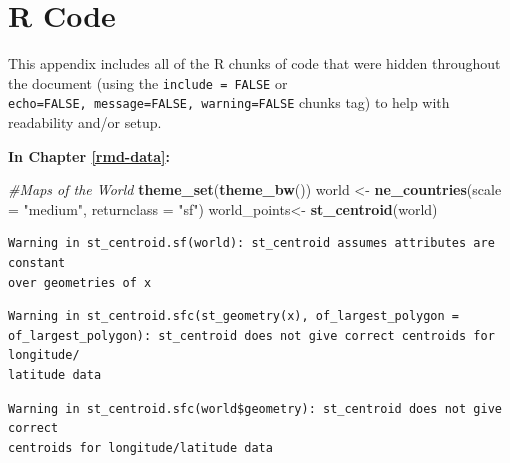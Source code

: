 \documentclass[12pt,oneside]{reedthesis}
\newenvironment{Shaded}{\begin{snugshade}}{\end{snugshade}}
\newcommand{\CommentTok}[1]{\textcolor[rgb]{0.56,0.35,0.01}{\textit{#1}}}
\newcommand{\DataTypeTok}[1]{\textcolor[rgb]{0.13,0.29,0.53}{#1}}
\newcommand{\KeywordTok}[1]{\textcolor[rgb]{0.13,0.29,0.53}{\textbf{#1}}}
\newcommand{\NormalTok}[1]{#1}
\newcommand{\OperatorTok}[1]{\textcolor[rgb]{0.81,0.36,0.00}{\textbf{#1}}}
\newcommand{\StringTok}[1]{\textcolor[rgb]{0.31,0.60,0.02}{#1}}
\begin{document}
\hypertarget{r-code}{%
\chapter{R Code}\label{r-code}}

This appendix includes all of the R chunks of code that were hidden throughout the document (using the \texttt{include\ =\ FALSE} or \texttt{echo=FALSE,\ message=FALSE,\ warning=FALSE} chunks tag) to help with readability and/or setup.

\textbf{In Chapter \ref{rmd-data}:}
\begin{Shaded}
\begin{Highlighting}[]
\CommentTok{#Maps of the World}
\KeywordTok{theme_set}\NormalTok{(}\KeywordTok{theme_bw}\NormalTok{())}
\NormalTok{world <-}\StringTok{ }\KeywordTok{ne_countries}\NormalTok{(}\DataTypeTok{scale =} \StringTok{"medium"}\NormalTok{, }\DataTypeTok{returnclass =} \StringTok{"sf"}\NormalTok{)}
\NormalTok{world_points<-}\StringTok{ }\KeywordTok{st_centroid}\NormalTok{(world)}
\end{Highlighting}
\end{Shaded}
\begin{verbatim}
Warning in st_centroid.sf(world): st_centroid assumes attributes are constant
over geometries of x
\end{verbatim}
\begin{verbatim}
Warning in st_centroid.sfc(st_geometry(x), of_largest_polygon =
of_largest_polygon): st_centroid does not give correct centroids for longitude/
latitude data
\end{verbatim}
\begin{Shaded}
\end{Shaded}
\begin{verbatim}
Warning in st_centroid.sfc(world$geometry): st_centroid does not give correct
centroids for longitude/latitude data
\end{verbatim}
\end{document}
